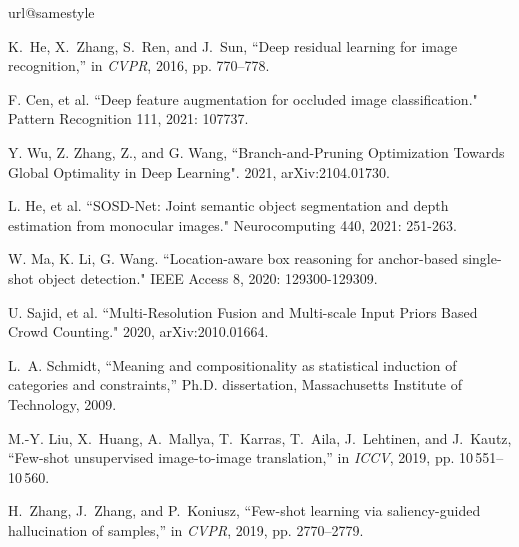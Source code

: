 \documentclass[10pt, conference, compsocconf]{IEEEtran}
\begin{document}
\begin{thebibliography}{10}\setlength\itemsep{0.28em}
\csname url@samestyle\endcsname
\providecommand{\newblock}{\relax}
\providecommand{\bibinfo}[2]{#2}
\providecommand{\BIBentrySTDinterwordspacing}{\spaceskip=0pt\relax}
\providecommand{\BIBentryALTinterwordstretchfactor}{4}
\providecommand{\BIBentryALTinterwordspacing}{\spaceskip=\fontdimen2\font plus
\BIBentryALTinterwordstretchfactor\fontdimen3\font minus
  \fontdimen4\font\relax}
\providecommand{\BIBforeignlanguage}[2]{{\expandafter\ifx\csname l@#1\endcsname\relax
\typeout{** WARNING: IEEEtran.bst: No hyphenation pattern has been}\typeout{** loaded for the language `#1'. Using the pattern for}\typeout{** the default language instead.}\else
\language=\csname l@#1\endcsname
\fi
#2}}
\providecommand{\BIBdecl}{\relax}
\BIBdecl

K.~He, X.~Zhang, S.~Ren, and J.~Sun, ``Deep residual learning for image
  recognition,'' in \emph{CVPR}, 2016, pp. 770--778.

F. Cen, et al. ``Deep feature augmentation for occluded image classification." Pattern Recognition 111, 2021: 107737.

Y. Wu, Z. Zhang, Z., and G. Wang, ``Branch-and-Pruning Optimization Towards Global Optimality in Deep Learning". 2021, arXiv:2104.01730.

L. He, et al. ``SOSD-Net: Joint semantic object segmentation and depth estimation from monocular images." Neurocomputing 440, 2021: 251-263.

W. Ma, K. Li, G. Wang. ``Location-aware box reasoning for anchor-based single-shot object detection." IEEE Access 8, 2020: 129300-129309.

U. Sajid, et al. ``Multi-Resolution Fusion and Multi-scale Input Priors Based Crowd Counting." 2020, arXiv:2010.01664.

L.~A. Schmidt, ``Meaning and compositionality as statistical induction of
  categories and constraints,'' Ph.D. dissertation, Massachusetts Institute of
  Technology, 2009.

M.-Y. Liu, X.~Huang, A.~Mallya, T.~Karras, T.~Aila, J.~Lehtinen, and J.~Kautz,
  ``Few-shot unsupervised image-to-image translation,'' in \emph{ICCV}, 2019,
  pp. 10\,551--10\,560.

H.~Zhang, J.~Zhang, and P.~Koniusz, ``Few-shot learning via saliency-guided
  hallucination of samples,'' in \emph{CVPR}, 2019, pp. 2770--2779.


\end{thebibliography}
\end{document}
